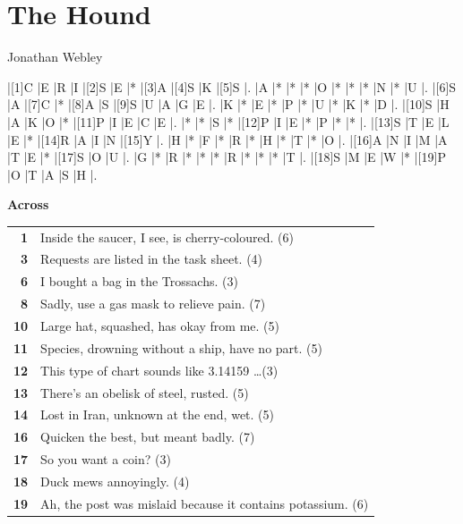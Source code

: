 \documentclass[a4paper,twoside,twocolumn]{article}
\newcommand{\AUTHOR}[1]
{
\textsf{#1} \vspace{1em}
}
\begin{document}
\section{The Hound}

\AUTHOR{Jonathan Webley}


\begin{Puzzle}{11}{11}
|[1]C |E |R |I |[2]S |E |* |[3]A |[4]S |K |[5]S |.
|A |* |* |* |O |* |* |* |N |* |U |.
|[6]S |A |[7]C |* |[8]A |S |[9]S |U |A |G |E |.
|K |* |E |* |P |* |U |* |K |* |D |.
|[10]S |H |A |K |O |* |[11]P |I |E |C |E |.
|* |* |S |* |[12]P |I |E |* |P |* |* |.
|[13]S |T |E |L |E |* |[14]R |A |I |N |[15]Y |.
|H |* |F |* |R |* |H |* |T |* |O |.
|[16]A |N |I |M |A |T |E |* |[17]S |O |U |.
|G |* |R |* |* |* |R |* |* |* |T |.
|[18]S |M |E |W |* |[19]P |O |T |A |S |H |.
\end{Puzzle}

\noindent \textbf{Across} \\[2ex]
{\renewcommand{\arraystretch}{1.2}
\begin{tabular}{r p{6.7cm}}
 \textbf{1} & Inside the saucer, I see, is cherry-coloured. (6) \\
 \textbf{3} & Requests are listed in the task sheet. (4) \\
 \textbf{6} & I bought a bag in the Trossachs. (3) \\
 \textbf{8} & Sadly, use a gas mask to relieve pain. (7) \\
 \textbf{10} & Large hat, squashed, has okay from me. (5) \\
 \textbf{11} & Species, drowning without a ship, have no part. (5) \\
 \textbf{12} & This type of chart sounds like 3.14159 \dots (3) \\
 \textbf{13} & There's an obelisk of steel, rusted. (5) \\
 \textbf{14} & Lost in Iran, unknown at the end, wet. (5) \\
 \textbf{16} & Quicken the best, but meant badly. (7) \\
 \textbf{17} & So you want a coin? (3) \\
 \textbf{18} & Duck mews annoyingly. (4) \\
 \textbf{19} & Ah, the post was mislaid because it contains potassium. (6) \\
\end{tabular}}
\end{document}
